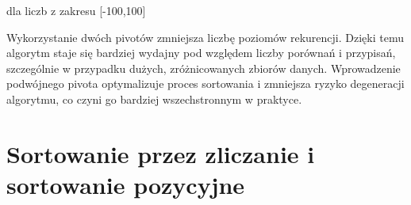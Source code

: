 \documentclass{article}
\begin{document}
\begin{table}[h]
	\centering
	\caption{Liczba porównań i przypisań dla \texttt{QUICK\_SORT} i \texttt{QUICK\_SORT2}} dla liczb z zakresu [-100,100]
	\label{tab:qs_classic}
\end{table}

Wykorzystanie dwóch pivotów zmniejsza liczbę poziomów rekurencji. Dzięki temu algorytm staje się bardziej wydajny pod względem liczby porównań i przypisań, szczególnie w przypadku dużych, zróżnicowanych zbiorów danych. Wprowadzenie podwójnego pivota optymalizuje proces sortowania i zmniejsza ryzyko degeneracji algorytmu, co czyni go bardziej wszechstronnym w praktyce.

\section{Sortowanie przez zliczanie i sortowanie pozycyjne}
\end{document}
